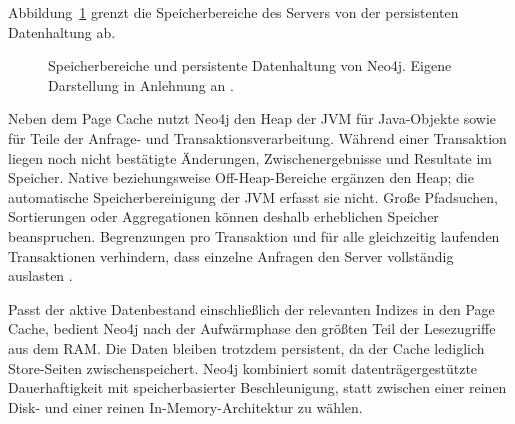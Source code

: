 Abbildung~\ref{fig:memory-architecture} grenzt die Speicherbereiche des Servers von der persistenten Datenhaltung ab.

\begin{figure}[htbp]
	\centering
	\caption{Speicherbereiche und persistente Datenhaltung von Neo4j. Eigene Darstellung in Anlehnung an \cite{neo4j2026memory}.}
	\label{fig:memory-architecture}
\end{figure}

Neben dem Page Cache nutzt Neo4j den Heap der \ac{JVM} für Java-Objekte sowie für Teile der Anfrage- und Transaktionsverarbeitung. Während einer Transaktion liegen noch nicht bestätigte Änderungen, Zwischenergebnisse und Resultate im Speicher. Native beziehungsweise Off-Heap-Bereiche ergänzen den Heap; die automatische Speicherbereinigung der \ac{JVM} erfasst sie nicht. Große Pfadsuchen, Sortierungen oder Aggregationen können deshalb erheblichen Speicher beanspruchen. Begrenzungen pro Transaktion und für alle gleichzeitig laufenden Transaktionen verhindern, dass einzelne Anfragen den Server vollständig auslasten \cite{neo4j2026memory}.

Passt der aktive Datenbestand einschließlich der relevanten Indizes in den Page Cache, bedient Neo4j nach der Aufwärmphase den größten Teil der Lesezugriffe aus dem \ac{RAM}. Die Daten bleiben trotzdem persistent, da der Cache lediglich Store-Seiten zwischenspeichert. Neo4j kombiniert somit datenträgergestützte Dauerhaftigkeit mit speicherbasierter Beschleunigung, statt zwischen einer reinen Disk- und einer reinen In-Memory-Architektur zu wählen.
